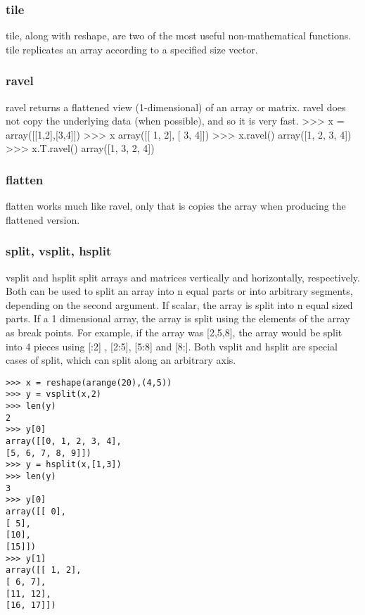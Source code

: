 \subsubsection{tile}
tile, along with reshape, are two of the most useful non-mathematical functions. tile replicates an array
according to a specified size vector. 


\subsubsection{ravel}
ravel returns a flattened view (1-dimensional) of an array or matrix. ravel does not copy the underlying
data (when possible), and so it is very fast.
>>> x = array([[1,2],[3,4]])
>>> x
array([[ 1, 2],
[ 3, 4]])
>>> x.ravel()
array([1, 2, 3, 4])
>>> x.T.ravel()
array([1, 3, 2, 4])
\subsubsection{flatten}
flatten works much like ravel, only that is copies the array when producing the flattened version.



\subsubsection{split, vsplit, hsplit}
vsplit and hsplit split arrays and matrices vertically and horizontally, respectively. Both can be used to
split an array into n equal parts or into arbitrary segments, depending on the second argument. If scalar,
the array is split into n equal sized parts. If a 1 dimensional array, the array is split using the elements of
the array as break points. For example, if the array was [2,5,8], the array would be split into 4 pieces using
[:2] , [2:5], [5:8] and [8:]. Both vsplit and hsplit are special cases of split, which can split along an
arbitrary axis.
\begin{framed}
\begin{verbatim}
>>> x = reshape(arange(20),(4,5))
>>> y = vsplit(x,2)
>>> len(y)
2
>>> y[0]
array([[0, 1, 2, 3, 4],
[5, 6, 7, 8, 9]])
>>> y = hsplit(x,[1,3])
>>> len(y)
3
>>> y[0]
array([[ 0],
[ 5],
[10],
[15]])
>>> y[1]
array([[ 1, 2],
[ 6, 7],
[11, 12],
[16, 17]])
\end{verbatim}
\end{framed}

